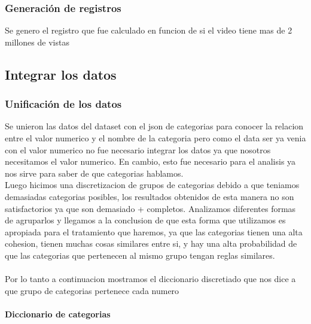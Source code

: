     \subsubsection{Generación de registros}
        Se genero el registro  que fue calculado en funcion de si
        el video tiene mas de 2 millones de vistas

\subsection{Integrar los datos}
    \subsubsection{Unificación de los datos}

        Se unieron las datos del dataset con el json de categorias para conocer
        la relacion entre el valor numerico y el nombre de la categoria pero como
        el data ser ya venia con el valor numerico no fue necesario integrar los
        datos ya que nosotros necesitamos el valor numerico. En cambio, esto fue
        necesario para el analisis ya nos sirve para saber de que categorias
        hablamos. \\
        Luego hicimos una discretizacion de grupos de categorias
        debido a que teniamos demasiadas categorias posibles, los resultados
        obtenidos de esta manera no son satisfactorios ya que son demasiado +
        completos. Analizamos diferentes formas de agruparlos y llegamos a la
        conclusion de que esta forma que utilizamos es apropiada para el
        tratamiento que haremos, ya que las categorias tienen una alta
        cohesion, tienen muchas cosas similares entre si, y hay una alta
        probabilidad de que las categorias que pertenecen al mismo grupo tengan
        reglas similares.\\\\

        Por lo tanto a continuacion mostramos el diccionario discretiado que nos
        dice a que grupo de categorias pertenece cada numero\\

        \paragraph{Diccionario de categorias}

